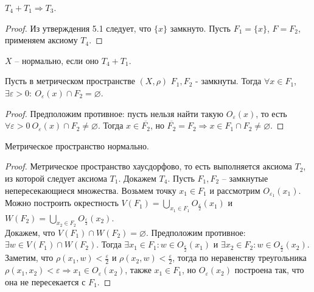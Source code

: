 \begin{statement}
    $T_4 + T_1 \Rightarrow T_3$. 
\end{statement}
\begin{proof}
    Из утверждения 5.1 следует, что $\{x\}$ замкнуто. Пусть $F_1 = \{x\}$, $F = F_2$, применяем аксиому $T_4$. 
\end{proof}

\begin{definition}
    $X$ -- нормально, если оно $T_4 + T_1$. 
\end{definition}

\begin{lemma}
    Пусть в метрическом пространстве $(X, \rho)$ $F_1,F_2$ - замкнуты. Тогда $\forall x \in F_1$, $\exists \varepsilon > 0:\ O_{\varepsilon}(x)\cap F_2 = \varnothing$.
\end{lemma}
\begin{proof}
    Предположим противное: пусть нельзя найти такую $O_{\varepsilon}(x)$, то есть $\forall \varepsilon > 0\ O_{\varepsilon}(x) \cap F_2 \neq \varnothing$. Тогда $x \in \overline{F_2}$, но $\overline{F_2} = F_2 \Longrightarrow x \in F_1 \cap F_2 \neq \varnothing$.  
\end{proof}

\begin{theorem}
    Метрическое пространство нормально.
\end{theorem}
\begin{proof}
    Метрическое пространство хаусдорфово, то есть выполняется аксиома $T_2$, из которой следует аксиома $T_1$. Докажем $T_4$. Пусть $F_1, F_2$ -- замкнутые непересекающиеся множества. Возьмем точку $x_1 \in F_1$ и рассмотрим $O_{\varepsilon_1}(x_1)$. Можно построить окрестность $V(F_1) = \underset{x_1 \in F_1}{\bigcup} O_{\frac{\varepsilon}{2}}(x_1)$ и $W(F_2) = \underset{x_2 \in F_2}{\bigcup} O_{\frac{\varepsilon}{2}}(x_2)$.\\
    Докажем, что $V(F_1) \cap W(F_2) = \varnothing$. Предположим противное: $\exists w \in V(F_1) \cap W(F_2)$. Тогда $\exists x_1 \in F_1: w \in O_{\frac{\varepsilon}{2}}(x_1)$ и $\exists x_2 \in F_2: w \in O_{\frac{\varepsilon}{2}}(x_2)$. Заметим, что $\rho(x_1, w) < \frac{\varepsilon}{2}$ и $\rho(x_2, w) < \frac{\varepsilon}{2}$, тогда по неравенству треугольника $\rho(x_1,x_2) < \varepsilon \Rightarrow x_1 \in O_{\varepsilon}(x_2)$, также $x_1 \in F_1$, но $O_{\varepsilon}(x_2)$ построена так, что она не пересекается с $F_1$.
\end{proof}